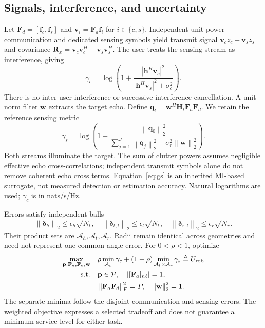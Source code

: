 \documentclass[10pt,journal,onecolumn,draftclsnofoot]{IEEEtran}
\newcommand{\Fa}{\mathbf F_a}
\newcommand{\Fd}{\mathbf F_d}
\newcommand{\pp}{\mathbf p}
\newcommand{\vv}{\mathbf v}
\newcommand{\ww}{\mathbf w}
\newcommand{\hh}{\mathbf h}
\newcommand{\ddelta}{\bm\delta}
\newcommand{\norm}[1]{\left\|#1\right\|}
\begin{document}
\subsection{Signals, interference, and uncertainty}
Let $\Fd=[\mathbf f_c,\mathbf f_s]$ and $\vv_i=\Fa\mathbf f_i$ for $i\in\{c,s\}$. Independent unit-power communication and dedicated sensing symbols yield transmit signal $\vv_cz_c+\vv_sz_s$ and covariance $\mathbf R_x=\vv_c\vv_c^H+\vv_s\vv_s^H$. The user treats the sensing stream as interference, giving
\begin{equation}
 \gamma_c=\log\left(1+\frac{|\hh^H\vv_c|^2}{|\hh^H\vv_s|^2+\sigma_c^2}\right).\label{eq:gc}
\end{equation}
There is no inter-user interference or successive interference cancellation. A unit-norm filter $\ww$ extracts the target echo. Define $\mathbf q_l=\ww^H\mathbf H_l\Fa\Fd$. We retain the reference sensing metric
\begin{equation}
 \gamma_s=\log\left(1+\frac{\norm{\mathbf q_0}_2^2}{\sum_{j=1}^J\norm{\mathbf q_j}_2^2+\sigma_r^2\norm{\ww}_2^2}\right).\label{eq:gs}
\end{equation}
Both streams illuminate the target. The sum of clutter powers assumes negligible effective echo cross-correlations; independent transmit symbols alone do not remove coherent echo cross terms. Equation~\eqref{eq:gs} is an inherited MI-based surrogate, not measured detection or estimation accuracy. Natural logarithms are used; $\gamma_c$ is in nats/s/Hz.

Errors satisfy independent balls
\begin{equation}
 \norm{\ddelta_h}_2\le\epsilon_h\sqrt{N_t},\quad
 \norm{\ddelta_{t,l}}_2\le\epsilon_t\sqrt{N_t},\quad
 \norm{\ddelta_{r,l}}_2\le\epsilon_r\sqrt{N_r}.\label{eq:balls}
\end{equation}
Their product sets are $\mathcal A_h,\mathcal A_t,\mathcal A_r$. Radii remain identical across geometries and need not represent one common angle error. For $0<\rho<1$, optimize
\begin{equation}
\begin{aligned}
 \max_{\pp,\Fa,\Fd,\ww}\quad &\rho\min_{\mathcal A_h}\gamma_c+
 (1-\rho)\min_{\mathcal A_t\times\mathcal A_r}\gamma_s\triangleq U_{\rm rob}\\
 \text{s.t.}\quad &\pp\in\mathcal P,\quad |[\Fa]_{n\ell}|=1,\\
 &\norm{\Fa\Fd}_F^2=P,\quad \norm{\ww}_2^2=1.
\end{aligned}\label{eq:opt}
\end{equation}
The separate minima follow the disjoint communication and sensing errors. The weighted objective expresses a selected tradeoff and does not guarantee a minimum service level for either task.
\end{document}
